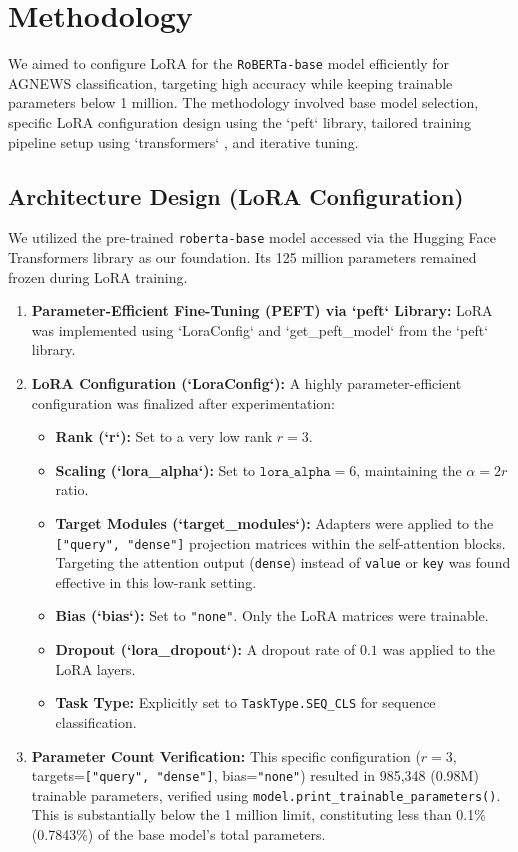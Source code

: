 \documentclass[twoside, 11pt]{article}
\begin{document}
\section{Methodology}
\label{sec:method}
We aimed to configure LoRA for the \texttt{RoBERTa-base} model efficiently for AGNEWS classification, targeting high accuracy while keeping trainable parameters below 1 million. The methodology involved base model selection, specific LoRA configuration design using the `peft` library, tailored training pipeline setup using `transformers` \cite{wolf-etal-2020-transformers}, and iterative tuning.

\subsection{Architecture Design (LoRA Configuration)}
We utilized the pre-trained \texttt{roberta-base} model accessed via the Hugging Face Transformers library as our foundation. Its 125 million parameters remained frozen during LoRA training.

\begin{enumerate}
    \item \textbf{Parameter-Efficient Fine-Tuning (PEFT) via `peft` Library:} LoRA was implemented using `LoraConfig` and `get\_peft\_model` from the `peft` library.
    \item \textbf{LoRA Configuration (`LoraConfig`):} A highly parameter-efficient configuration was finalized after experimentation:
        \begin{itemize}
            \item \textbf{Rank (`r`):} Set to a very low rank $r=3$.
            \item \textbf{Scaling (`lora\_alpha`):} Set to $\texttt{lora\_alpha} = 6$, maintaining the $ \alpha = 2r $ ratio.
            \item \textbf{Target Modules (`target\_modules`):} Adapters were applied to the \texttt{["query", "dense"]} projection matrices within the self-attention blocks. Targeting the attention output (\texttt{dense}) instead of \texttt{value} or \texttt{key} was found effective in this low-rank setting.
            \item \textbf{Bias (`bias`):} Set to \texttt{"none"}. Only the LoRA matrices were trainable.
            \item \textbf{Dropout (`lora\_dropout`):} A dropout rate of $0.1$ was applied to the LoRA layers.
            \item \textbf{Task Type:} Explicitly set to \texttt{TaskType.SEQ\_CLS} for sequence classification.
        \end{itemize}
    \item \textbf{Parameter Count Verification:} This specific configuration ($r=3$, targets=\texttt{["query", "dense"]}, bias=\texttt{"none"}) resulted in 985,348 (0.98M) trainable parameters, verified using \texttt{model.print\_trainable\_parameters()}. This is substantially below the 1 million limit, constituting less than 0.1\% (0.7843\%) of the base model's total parameters.
\end{enumerate}
\end{document}
